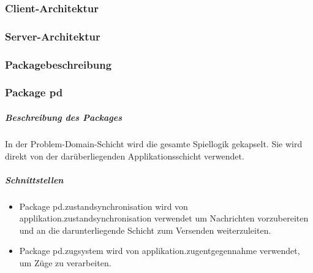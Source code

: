 \documentclass[a4paper,12pt,halfparskip,DIV14]{scrartcl}
\begin{document}
\subsubsection{Client-Architektur}

\subsubsection{Server-Architektur}

\subsubsection{Packagebeschreibung} %
\label{sub:pagebeschreibung}

\subsubsection{Package pd} %
\label{ssub:package_pd}
\subparagraph{Beschreibung des Packages} %
\label{ssub:beschreibung_des_packages}
In der Problem-Domain-Schicht wird die gesamte Spiellogik gekapselt. Sie wird direkt von der darüberliegenden Applikationsschicht verwendet.
\subparagraph{Schnittstellen} %
\label{ssub:schnittstellen}
\begin{itemize}
	\item Package pd.zustandsynchronisation wird von applikation.zustandsynchronisation verwendet um Nachrichten vorzubereiten und an die darunterliegende Schicht zum Versenden weiterzuleiten.
	\item Package pd.zugsystem wird von applikation.zugentgegennahme verwendet, um Züge zu verarbeiten.
\end{itemize}

\clearpage
\end{document}
